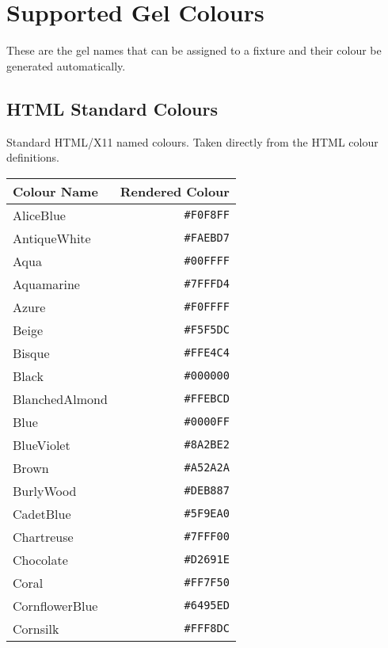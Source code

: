 \documentclass[a4paper]{article}
\begin{document}
\section{Supported Gel Colours}
These are the gel names that can be assigned to a fixture and their colour be 
generated automatically.

\subsection{HTML Standard Colours}
Standard HTML/X11 named colours. Taken directly from the HTML colour 
definitions.
\begin{longtable}{|l|r|}
\hline
Colour Name & Rendered Colour \\ \hline
AliceBlue & \texttt{\#F0F8FF} \cellcolor[HTML]{F0F8FF} \\
AntiqueWhite & \texttt{\#FAEBD7} \cellcolor[HTML]{FAEBD7} \\
Aqua & \texttt{\#00FFFF} \cellcolor[HTML]{00FFFF} \\
Aquamarine & \texttt{\#7FFFD4} \cellcolor[HTML]{7FFFD4} \\
Azure & \texttt{\#F0FFFF} \cellcolor[HTML]{F0FFFF} \\
Beige & \texttt{\#F5F5DC} \cellcolor[HTML]{F5F5DC} \\
Bisque & \texttt{\#FFE4C4} \cellcolor[HTML]{FFE4C4} \\
Black & \texttt{\#000000} \cellcolor[HTML]{000000} \\
BlanchedAlmond & \texttt{\#FFEBCD} \cellcolor[HTML]{FFEBCD} \\
Blue & \texttt{\#0000FF} \cellcolor[HTML]{0000FF} \\
BlueViolet & \texttt{\#8A2BE2} \cellcolor[HTML]{8A2BE2} \\
Brown & \texttt{\#A52A2A} \cellcolor[HTML]{A52A2A} \\
BurlyWood & \texttt{\#DEB887} \cellcolor[HTML]{DEB887} \\
CadetBlue & \texttt{\#5F9EA0} \cellcolor[HTML]{5F9EA0} \\
Chartreuse & \texttt{\#7FFF00} \cellcolor[HTML]{7FFF00} \\
Chocolate & \texttt{\#D2691E} \cellcolor[HTML]{D2691E} \\
Coral & \texttt{\#FF7F50} \cellcolor[HTML]{FF7F50} \\
CornflowerBlue & \texttt{\#6495ED} \cellcolor[HTML]{6495ED} \\
Cornsilk & \texttt{\#FFF8DC} \cellcolor[HTML]{FFF8DC} \\

\end{longtable}
\end{document}
